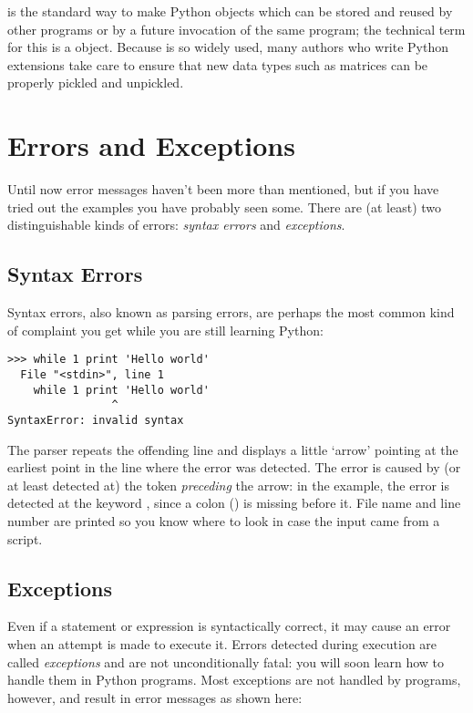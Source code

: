 \documentclass{manual}
\begin{document}
 is the standard way to make Python objects which can
be stored and reused by other programs or by a future invocation of
the same program; the technical term for this is a
 object.  Because  is so widely used,
many authors who write Python extensions take care to ensure that new
data types such as matrices can be properly pickled and unpickled.



\chapter{Errors and Exceptions \label{errors}}

Until now error messages haven't been more than mentioned, but if you
have tried out the examples you have probably seen some.  There are
(at least) two distinguishable kinds of errors:
\emph{syntax errors} and \emph{exceptions}.

\section{Syntax Errors \label{syntaxErrors}}

Syntax errors, also known as parsing errors, are perhaps the most common
kind of complaint you get while you are still learning Python:

\begin{verbatim}
>>> while 1 print 'Hello world'
  File "<stdin>", line 1
    while 1 print 'Hello world'
                ^
SyntaxError: invalid syntax
\end{verbatim}

The parser repeats the offending line and displays a little `arrow'
pointing at the earliest point in the line where the error was
detected.  The error is caused by (or at least detected at) the token
\emph{preceding} the arrow: in the example, the error is detected at
the keyword , since a colon (\character{:}) is missing
before it.  File name and line number are printed so you know where to
look in case the input came from a script.

\section{Exceptions \label{exceptions}}

Even if a statement or expression is syntactically correct, it may
cause an error when an attempt is made to execute it.
Errors detected during execution are called \emph{exceptions} and are
not unconditionally fatal: you will soon learn how to handle them in
Python programs.  Most exceptions are not handled by programs,
however, and result in error messages as shown here:
\end{document}
